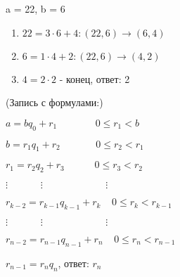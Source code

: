 \begin{eg}
    a = 22, b = 6
    \begin{enumerate}
        \item $22 = 3 \cdot  6 + 4: (22, 6) \to (6, 4)$
        \item $6 = 1 \cdot 4 + 2: (22, 6) \to (4, 2)$
        \item $4 = 2 \cdot 2$ - конец, ответ: 2
        
    \end{enumerate}
\end{eg}

\begin{remark} (Запись с формулами:)
    
    
    $a = bq_0 + r_1  \;\;\;\;\;\;\;\;\;\;\;\;\;\;    0 \leq r_1 < b$
    
    $b = r_1q_1 + r_2  \;\;\;\;\;\;\;\;\;\;\;\;\;    0 \leq r_2 < r_1$
    
    $r_1 = r_2q_2 + r_3  \;\;\;\;\;\;\;\;\;\;\;    0 \leq r_3 < r_2$
    
    
    $\vdots \;\;\;\;\;\;\;\;\;\;\;\; \vdots \;\;\;\;\;\;\;\;\;\;\;\;\;\;\;\;\;\;\;\;\;\;\; \vdots$

    $r_{k-2} = r_{k-1}q_{k-1} + r_k  \;\;\;\;  0 \leq r_k <r_{k-1}$

    $\vdots \;\;\;\;\;\;\;\;\;\;\;\; \vdots \;\;\;\;\;\;\;\;\;\;\;\;\;\;\;\;\;\;\;\;\;\;\; \vdots$

    $r_{n-2} = r_{n-1}q_{n-1} + r_n   \;\;\;\;  0 \leq r_n <r_{n-1}$

    $r_{n-1} = r_nq_n$, ответ: $r_n$
\end{remark}